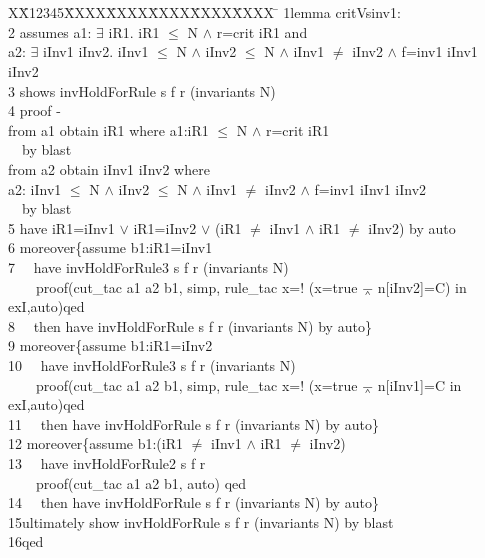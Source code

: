 \documentclass{llncs}
\newlength{\fminilength}
\newenvironment{fmini}[1][\linewidth]
  {\setlength{\fminilength}{#1\fboxsep-2\fboxrule}%
   \vspace{2ex}\noindent\begin{lrbox}{\fminibox}\begin{minipage}{\fminilength}%
   \mbox{ }\hfill\vspace{-2.5ex}}%
  {\end{minipage}\end{lrbox}\vspace{1ex}\hspace{0ex}%
   \framebox{\usebox{\fminibox}}}
\newenvironment{specification}
{\noindent\scriptsize
\tt\begin{fmini}\begin{tabbing}X\=X12345\=XXXX\=XXXX\=XXXX\=XXXX\=XXXX
\=\+\kill} {\end{tabbing}\normalfont\end{fmini}}
\def \twoSpaces {\ \ }
\def \andc {\barwedge }
\def \negc {!}
\def \iInv {iInv}
\def \iR {iR}
\begin{document}
\begin{specification}
1lemma critVsinv1:\\
2  assumes  a1: $\exists$ \iR1. \iR1 $\le$ N $\wedge$ r=crit \iR1 and \\
  a2: $\exists$  \iInv1 \iInv2. \iInv1 $\le$ N $\wedge$ \iInv2 $\le$ N $\wedge$ \iInv1 $\neq$ \iInv2 $\wedge$ f=inv1  \iInv1 \iInv2\\
3  shows  invHoldForRule s f r (invariants
  N)\\
4  proof -\\
   from a1 obtain \iR1 where a1:\iR1 $\le$ N $\wedge$ r=crit \iR1 \\
\twoSpaces   by blast\\
   from a2 obtain \iInv1 \iInv2 where \\
   a2: \iInv1 $\le$ N $\wedge$ \iInv2 $\le$ N $\wedge$ \iInv1 $\neq$ \iInv2 $\wedge$ f=inv1  \iInv1 \iInv2\\
\twoSpaces   by blast \\
5  have iR1=\iInv1 $\vee$ \iR1=\iInv2 $\vee$ (\iR1 $\ne$ \iInv1 $\wedge$  \iR1 $\ne$ \iInv2) by auto\\

6  moreover\{assume  b1:\iR1=\iInv1\\
7  \twoSpaces have invHoldForRule3 s f r (invariants N)\\
 \twoSpaces  \twoSpaces   proof(cut\_tac a1 a2 b1, simp, rule\_tac x=$\negc$ (x=true $\andc$ n[\iInv2]=C)  in exI,auto)qed\\
8  \twoSpaces then have invHoldForRule s f r
(invariants
  N)
by auto\}\\

9  moreover\{assume  b1:iR1=\iInv2\\
10 \twoSpaces have invHoldForRule3 s f r (invariants N)\\
 \twoSpaces \twoSpaces   proof(cut\_tac a1 a2 b1, simp, rule\_tac x=$\negc$ (x=true $\andc$ n[\iInv1]=C  in exI,auto)qed\\
11 \twoSpaces then have invHoldForRule s f r (invariants
  N)
by auto\}\\

12   moreover\{assume  b1:(\iR1 $\ne$  \iInv1 $\wedge$   \iR1 $\ne$  \iInv2)\\
13 \twoSpaces have invHoldForRule2 s f r  \\
  \twoSpaces \twoSpaces  proof(cut\_tac a1 a2 b1,  auto) qed\\
14 \twoSpaces then have invHoldForRule s f r
(invariants
  N)
by auto\} \\

15ultimately show invHoldForRule s f r
(invariants N) by blast\\
16qed\\
\end{specification}
\end{document}
